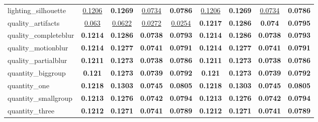 \begin{center}
\begin{supertabular}{lcccc||cccc}
\small{lighting\_silhouette} & \underline{\scriptsize{0.1206}} & \textbf{\scriptsize{0.1269}} & \underline{\scriptsize{0.0734}} & \textbf{\scriptsize{0.0786}}& \underline{\scriptsize{0.1206}} & \textbf{\scriptsize{0.1269}} & \underline{\scriptsize{0.0734}} & \textbf{\scriptsize{0.0786}}\\
\small{quality\_artifacts} & \underline{\scriptsize{0.063}} & \underline{\scriptsize{0.0622}} & \underline{\scriptsize{0.0272}} & \underline{\scriptsize{0.0254}}& \textbf{\scriptsize{0.1217}} & \textbf{\scriptsize{0.1286}} & \textbf{\scriptsize{0.074}} & \textbf{\scriptsize{0.0795}}\\
\small{quality\_completeblur} & \textbf{\scriptsize{0.1214}} & \textbf{\scriptsize{0.1286}} & \textbf{\scriptsize{0.0738}} & \textbf{\scriptsize{0.0793}}& \textbf{\scriptsize{0.1214}} & \textbf{\scriptsize{0.1286}} & \textbf{\scriptsize{0.0738}} & \textbf{\scriptsize{0.0793}}\\
\small{quality\_motionblur} & \textbf{\scriptsize{0.1214}} & \textbf{\scriptsize{0.1277}} & \textbf{\scriptsize{0.0741}} & \textbf{\scriptsize{0.0791}}& \textbf{\scriptsize{0.1214}} & \textbf{\scriptsize{0.1277}} & \textbf{\scriptsize{0.0741}} & \textbf{\scriptsize{0.0791}}\\
\small{quality\_partialblur} & \textbf{\scriptsize{0.1211}} & \textbf{\scriptsize{0.1273}} & \textbf{\scriptsize{0.0738}} & \textbf{\scriptsize{0.0786}}& \textbf{\scriptsize{0.1211}} & \textbf{\scriptsize{0.1273}} & \textbf{\scriptsize{0.0738}} & \textbf{\scriptsize{0.0786}}\\
\small{quantity\_biggroup} & \textbf{\scriptsize{0.121}} & \textbf{\scriptsize{0.1273}} & \textbf{\scriptsize{0.0739}} & \textbf{\scriptsize{0.0792}}& \textbf{\scriptsize{0.121}} & \textbf{\scriptsize{0.1273}} & \textbf{\scriptsize{0.0739}} & \textbf{\scriptsize{0.0792}}\\
\small{quantity\_one} & \textbf{\scriptsize{0.1218}} & \textbf{\scriptsize{0.1303}} & \textbf{\scriptsize{0.0745}} & \textbf{\scriptsize{0.0805}}& \textbf{\scriptsize{0.1218}} & \textbf{\scriptsize{0.1303}} & \textbf{\scriptsize{0.0745}} & \textbf{\scriptsize{0.0805}}\\
\small{quantity\_smallgroup} & \textbf{\scriptsize{0.1213}} & \textbf{\scriptsize{0.1276}} & \textbf{\scriptsize{0.0742}} & \textbf{\scriptsize{0.0794}}& \textbf{\scriptsize{0.1213}} & \textbf{\scriptsize{0.1276}} & \textbf{\scriptsize{0.0742}} & \textbf{\scriptsize{0.0794}}\\
\small{quantity\_three} & \textbf{\scriptsize{0.1212}} & \textbf{\scriptsize{0.1271}} & \textbf{\scriptsize{0.0741}} & \textbf{\scriptsize{0.0789}}& \textbf{\scriptsize{0.1212}} & \textbf{\scriptsize{0.1271}} & \textbf{\scriptsize{0.0741}} & \textbf{\scriptsize{0.0789}}\\

\end{supertabular}
\end{center}
